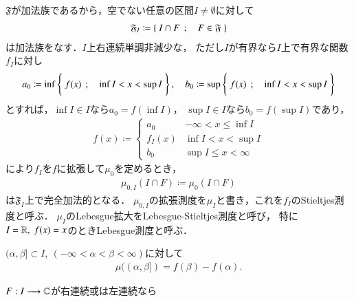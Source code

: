 	$\mathfrak{F}$が加法族であるから，空でない任意の区間$I \neq \emptyset$に対して
	\begin{align}
		\mathfrak{F}_I \coloneqq \left\{\ I \cap F\ \, ; \quad F \in \mathfrak{F}\ \right\}
	\end{align}
	は加法族をなす．$I$上右連続単調非減少な，
	ただし$I$が有界なら$I$上で有界な関数$f_I$に対し
	\begin{align}
		a_0 \coloneqq \operatorname*{inf}_{} \left\{\ f(x)\ \, ; \quad \operatorname*{inf}_{} I < x < \operatorname*{sup}_{} I\ \right\},
		\quad b_0 \coloneqq \operatorname*{sup}_{} \left\{\ f(x)\ \, ; \quad \operatorname*{inf}_{} I < x < \operatorname*{sup}_{} I\ \right\}
	\end{align}
	とすれば，$\inf{}{I} \in I$なら$a_0 = f(\inf{}{I})$，
	$\sup{}{I} \in I$なら$b_0 = f(\sup{}{I})$であり，
	\begin{align}
		f(x) \coloneqq 
		\begin{cases}
			a_0 & -\infty < x \leq \inf{}{I} \\
			f_I(x) & \inf{}{I} < x < \sup{}{I} \\
			b_0 & \sup{}{I} \leq x < \infty
		\end{cases}
	\end{align}
	により$f_I$を$f$に拡張して$\mu_0$を定めるとき，
	\begin{align}
		\mu_{0,I}(I \cap F) \coloneqq \mu_0(I \cap F)
	\end{align}
	は$\mathfrak{F}_I$上で完全加法的となる．
	$\mu_{0,I}$の拡張測度を$\mu_I$と書き，これを$f_I$のStieltjes測度と呼ぶ．
	$\mu_I$のLebesgue拡大をLebesgue-Stieltjes測度と呼び，
	特に$I = \mathbb{R},\ f(x) = x$のときLebesgue測度と呼ぶ．
	
	\begin{screen}
		\begin{thm}[左半開区間のStiletjes測度]
			$(\alpha,\beta] \subset I,\ (-\infty < \alpha < \beta < \infty)$に対して
			\begin{align}
				\mu((\alpha,\beta]) = f(\beta) - f(\alpha).
			\end{align}
		\end{thm}
	\end{screen}
	
	\begin{screen}
		\begin{thm}
			$F:I \longrightarrow \mathbb{C}$が右連続或は左連続なら
		\end{thm}
	\end{screen}
	
	\begin{screen}
		\begin{thm}[時間変更]
			
		\end{thm}
	\end{screen}